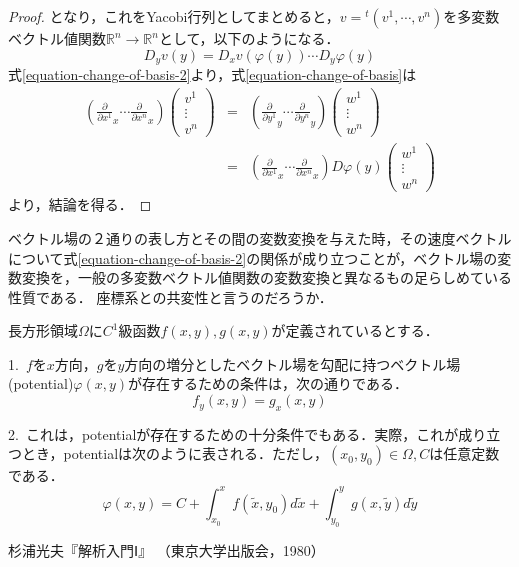 \documentclass[uplatex, 12pt, dvipdfmx]{jsarticle}
\begin{document}
\begin{proof}
    となり，これをYacobi行列としてまとめると，$v={}^t\!(v^1,\cdots,v^n)$を多変数ベクトル値関数$\mathbb{R}^n\to\mathbb{R}^n$として，以下のようになる．
    \[ D_yv(y) = D_xv(\varphi(y))\cdots D_y\varphi(y) \]
    式\ref{equation-change-of-basis-2}より，式\ref{equation-change-of-basis}は
    \begin{eqnarray*}
        \left( \frac{\partial}{\partial x^1}_x\cdots \frac{\partial}{\partial x^n}_x \right) \left( \begin{array}{c}
            v^1 \\ \vdots \\ v^n
        \end{array} \right) &=& \left( \frac{\partial}{\partial y^1}_y\cdots \frac{\partial}{\partial y^n}_y \right) \left( \begin{array}{c}
            w^1 \\ \vdots \\ w^n
        \end{array} \right) \\
        &=& \left( \frac{\partial}{\partial x^1}_x \cdots \frac{\partial}{\partial x^n}_x \right)D\varphi(y) \left( \begin{array}{c}
            w^1 \\ \vdots \\ w^n
        \end{array} \right)
    \end{eqnarray*}
    より，結論を得る．
\end{proof}
\begin{remark}
    ベクトル場の２通りの表し方とその間の変数変換を与えた時，その速度ベクトルについて式\ref{equation-change-of-basis-2}の関係が成り立つことが，ベクトル場の変数変換を，一般の多変数ベクトル値関数の変数変換と異なるもの足らしめている性質である．
    座標系との共変性と言うのだろうか．
\end{remark}

\clearpage
\begin{theorem}
    長方形領域$\Omega$に$C^1$級函数$f(x,y),g(x,y)$が定義されているとする．

    1.\, $f$を$x$方向，$g$を$y$方向の増分としたベクトル場を勾配に持つベクトル場(potential)$\varphi(x,y)$が存在するための条件は，次の通りである．
    \[ f_y(x,y)=g_x(x,y) \]

    2.\, これは，potentialが存在するための十分条件でもある．実際，これが成り立つとき，potentialは次のように表される．ただし，$(x_0,y_0)\in\Omega, C$は任意定数である．
    \[ \varphi(x,y) = C + \int^x_{x_0}f(\tilde{x},y_0)d\tilde{x}+\int^y_{y_0}g(x,\tilde{y})d\tilde{y} \]
\end{theorem}

\begin{thebibliography}{99}
        杉浦光夫『解析入門Ⅰ』
        （東京大学出版会，1980）
\end{thebibliography}
\end{document}
